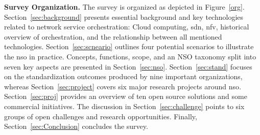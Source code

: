 \noindent \textbf{Survey Organization.}  The survey is organized as depicted in Figure~\ref{org}. Section~\ref{sec:background} presents essential background and key technologies related to network service orchestration: Cloud computing, \gls{sdn}, \gls{nfv}, historical overview of orchestration, and the relationship between all mentioned technologies. Section~\ref{sec:scneario} outlines four potential scenarios to illustrate the \gls{nso} in practice. Concepts, functions, scope, and an NSO taxonomy split into seven key aspects are presented in Section~\ref{sec:nso}. Section~\ref{sec:stand} focuses on the standardization outcomes produced by nine important organizations,   whereas Section~\ref{sec:project} covers six major research projects around \gls{nso}. Section~\ref{sec:proj} provides an overview of ten open source solutions and some commercial initiatives.  The discussion in Section~\ref{sec:challenge} points to six groups of open challenges and research opportunities. Finally, Section~\ref{sec:Conclusion} concludes the survey.

